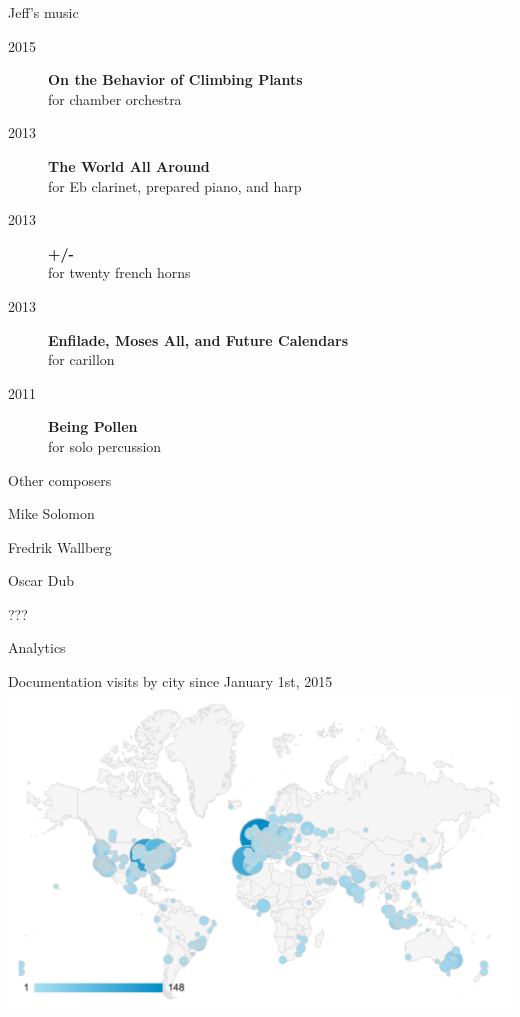 \documentclass[10pt]{beamer}
\begin{document}
\begin{frame}{Jeff's music}
    \begin{description}
        \item[2015] \textbf{On the Behavior of Climbing Plants} \\ 
            for chamber orchestra
        \item[2013] \textbf{The World All Around} \\ 
            for Eb clarinet, prepared piano, and harp
        \item[2013] \textbf{+/-} \\ 
            for twenty french horns
        \item[2013] \textbf{Enfilade, Moses All, and Future Calendars} \\ 
            for carillon
        \item[2011] \textbf{Being Pollen} \\ 
            for solo percussion
    \end{description}
\end{frame}

\begin{frame}{Other composers}

\begin{description}
\item Mike Solomon
\item Fredrik Wallberg
\item Oscar Dub
\item ???
\end{description}
\end{frame}

\begin{frame}{Analytics}
    \begin{center}
        Documentation visits by city since January 1st, 2015
        \includegraphics[scale=0.4, fbox]{analytics.png}
    \end{center}
\end{frame}
\end{document}
